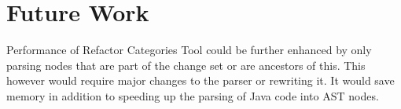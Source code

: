 
\chapter{Future Work}

Performance of Refactor Categories Tool could be further enhanced by only parsing nodes that are part of the change set or are ancestors of this.  This however would require major changes to the parser or rewriting it. It would save memory in addition to speeding up the parsing of Java code into AST nodes.



% 
% 
% 
% 
% 
% 
% 






